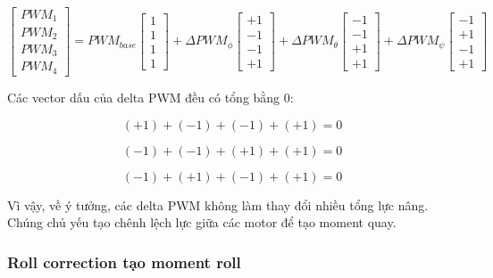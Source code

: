 \begin{equation}
\begin{bmatrix}
    PWM_1\\
    PWM_2\\
    PWM_3\\
    PWM_4
\end{bmatrix}
=
PWM_{base}
\begin{bmatrix}
    1\\
    1\\
    1\\
    1
\end{bmatrix}
+
\Delta PWM_\phi
\begin{bmatrix}
    +1\\
    -1\\
    -1\\
    +1
\end{bmatrix}
+
\Delta PWM_\theta
\begin{bmatrix}
    -1\\
    -1\\
    +1\\
    +1
\end{bmatrix}
+
\Delta PWM_\psi
\begin{bmatrix}
    -1\\
    +1\\
    -1\\
    +1
\end{bmatrix}
\end{equation}

Các vector dấu của delta PWM đều có tổng bằng $0$:

\begin{equation}
    (+1)+(-1)+(-1)+(+1)=0
\end{equation}

\begin{equation}
    (-1)+(-1)+(+1)+(+1)=0
\end{equation}

\begin{equation}
    (-1)+(+1)+(-1)+(+1)=0
\end{equation}

Vì vậy, về ý tưởng, các delta PWM không làm thay đổi nhiều tổng lực nâng. Chúng
chủ yếu tạo chênh lệch lực giữa các motor để tạo moment quay.

\subsubsection{Roll correction tạo moment roll}


